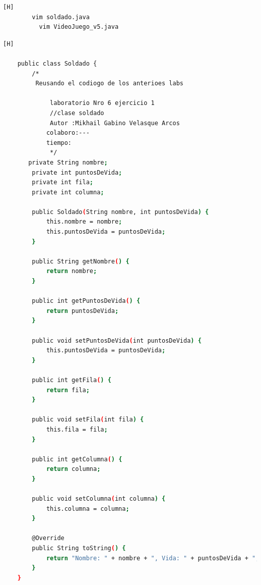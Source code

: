 \documentclass{article}
\begin{document}
	\begin{lstlisting}[language=bash,caption={Creando la clase soldado y la clase VideoJuego_v4}][H]
		vim soldado.java
		  vim VideoJuego_v5.java
	\end{lstlisting}
	
	\begin{lstlisting}[language=bash,caption={Creando la clase Soldado}][H]
			
	public class Soldado {
		/*
		 Reusando el codiogo de los anterioes labs
		
			 laboratorio Nro 6 ejercicio 1
			 //clase soldado
			 Autor :Mikhail Gabino Velasque Arcos
			colaboro:---
			tiempo:
			 */
	   private String nombre;
	    private int puntosDeVida;
	    private int fila;
	    private int columna;

	    public Soldado(String nombre, int puntosDeVida) {
	        this.nombre = nombre;
	        this.puntosDeVida = puntosDeVida;
	    }

	    public String getNombre() {
	        return nombre;
	    }

	    public int getPuntosDeVida() {
	        return puntosDeVida;
	    }

	    public void setPuntosDeVida(int puntosDeVida) {
	        this.puntosDeVida = puntosDeVida;
	    }

	    public int getFila() {
	        return fila;
	    }

	    public void setFila(int fila) {
	        this.fila = fila;
	    }

	    public int getColumna() {
	        return columna;
	    }

	    public void setColumna(int columna) {
	        this.columna = columna;
	    }

	    @Override
	    public String toString() {
	        return "Nombre: " + nombre + ", Vida: " + puntosDeVida + ", Fila: " + fila + ", Columna: " + columna;
	    }
	}
	
	\end{lstlisting}	
\end{document}
